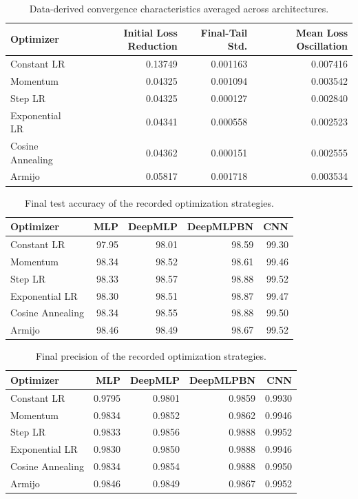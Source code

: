 \begin{table}[ht]
\centering
\caption{Data-derived convergence characteristics averaged across architectures.}
\label{tab:convergence_rate}
\begin{tabular}{lrrr}
\hline
Optimizer & Initial Loss Reduction & Final-Tail Std. & Mean Loss Oscillation \\
\hline
Constant LR & 0.13749 & 0.001163 & 0.007416 \\
Momentum & 0.04325 & 0.001094 & 0.003542 \\
Step LR & 0.04325 & 0.000127 & 0.002840 \\
Exponential LR & 0.04341 & 0.000558 & 0.002523 \\
Cosine Annealing & 0.04362 & 0.000151 & 0.002555 \\
Armijo & 0.05817 & 0.001718 & 0.003534 \\
\hline
\end{tabular}
\end{table}

\begin{table}[ht]
\centering
\caption{Final test accuracy of the recorded optimization strategies.}
\label{tab:test_accuracy}
\begin{tabular}{lrrrr}
\hline
Optimizer & MLP & DeepMLP & DeepMLPBN & CNN \\
\hline
Constant LR & 97.95 & 98.01 & 98.59 & 99.30 \\
Momentum & 98.34 & 98.52 & 98.61 & 99.46 \\
Step LR & 98.33 & 98.57 & 98.88 & 99.52 \\
Exponential LR & 98.30 & 98.51 & 98.87 & 99.47 \\
Cosine Annealing & 98.34 & 98.55 & 98.88 & 99.50 \\
Armijo & 98.46 & 98.49 & 98.67 & 99.52 \\
\hline
\end{tabular}
\end{table}

\begin{table}[ht]
\centering
\caption{Final precision of the recorded optimization strategies.}
\label{tab:precision_results}
\begin{tabular}{lrrrr}
\hline
Optimizer & MLP & DeepMLP & DeepMLPBN & CNN \\
\hline
Constant LR & 0.9795 & 0.9801 & 0.9859 & 0.9930 \\
Momentum & 0.9834 & 0.9852 & 0.9862 & 0.9946 \\
Step LR & 0.9833 & 0.9856 & 0.9888 & 0.9952 \\
Exponential LR & 0.9830 & 0.9850 & 0.9888 & 0.9946 \\
Cosine Annealing & 0.9834 & 0.9854 & 0.9888 & 0.9950 \\
Armijo & 0.9846 & 0.9849 & 0.9867 & 0.9952 \\
\hline
\end{tabular}
\end{table}

